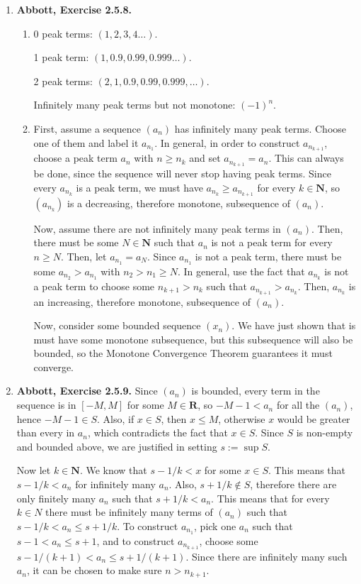 \documentclass{article}
\newcommand{\N}{\mathbf{N}}
\newcommand{\R}{\mathbf{R}}
\newcommand{\exc}[2][Abbott]{\item \textbf{#1, Exercise #2.}}
\begin{document}
\begin{enumerate}
    \exc{2.5.8}
    \begin{enumerate}
        \item 
        0 peak terms: $(1,2,3,4 \dots)$.
        
        1 peak term: \space $(1,0.9,0.99,0.999 \dots)$.
        
        2 peak terms: $(2,1,0.9,0.99, 0.999, \dots)$.
        
        Infinitely many peak terms but not monotone: $(-1)^n$.
        
        \item First, assume a sequence $(a_n)$ has infinitely many peak terms. Choose one of them and label it $a_{n_1}$. In general, in order to construct $a_{n_{k+1}}$, choose a peak term $a_n$ with $n \geq n_k$ and set $a_{n_{k+1}} = a_n$. This can always be done, since the sequence will never stop having peak terms. Since every $a_{n_k}$ is a peak term, we must have $a_{n_k} \geq a_{n_{k+1}}$ for every $k \in \N$, so $(a_{n_k})$ is a decreasing, therefore monotone, subsequence of $(a_n)$.
        
        Now, assume there are not infinitely many peak terms in $(a_n)$. Then, there must be some $N \in \N$ such that $a_n$ is not a peak term for every $n \geq N$. Then, let $a_{n_1} = a_N$. Since $a_{n_1}$ is not a peak term, there must be some $a_{n_2} > a_{n_1}$ with $n_2 > n_1 \geq N$. In general, use the fact that $a_{n_k}$ is not a peak term to choose some $n_{k+1} > n_k$ such that $a_{n_{k+1}} > a_{n_k}$. Then, $a_{n_k}$ is an increasing, therefore monotone, subsequence of $(a_n)$.
        
        Now, consider some bounded sequence $(x_n)$. We have just shown that is must have some monotone subsequence, but this subsequence will also be bounded, so the Monotone Convergence Theorem guarantees it must converge. 
    \end{enumerate}
    
    \exc{2.5.9}
    Since $(a_n)$ is bounded, every term in the sequence is in $[-M, M]$ for some $M \in \R$, so $-M-1 < a_n$ for all the $(a_n)$, hence $-M-1 \in S$. Also, if $x \in S$, then $x \leq M$, otherwise $x$ would be greater than every in $a_n$, which contradicts the fact that $x \in S$. Since $S$ is non-empty and bounded above, we are justified in setting $s := \sup S$.
    
    Now let $k \in \N$. We know that $s-1/k < x$ for some $x \in S$. This means that $s-1/k < a_n$ for infinitely many $a_n$. Also, $s + 1/k \notin S$, therefore there are only finitely many $a_n$ such that $ s + 1/k < a_n$. This means that for every $k \in N$ there must be infinitely many terms of $(a_n)$ such that $s-1/k < a_n \leq s+1/k$. To construct $a_{n_1}$, pick one $a_n$ such that $s-1 < a_n \leq s+1$, and to construct $a_{n_{k+1}}$, choose some $s-1/(k+1) < a_n \leq s+1/(k+1)$. Since there are infinitely many such $a_n$, it can be chosen to make sure $n > n_{k+1}$.
    

\end{enumerate}
\end{document}
